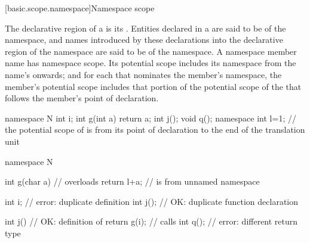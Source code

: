 [basic.scope.namespace]{Namespace scope}

\pnum
{}%
The declarative region of a  is its
.  Entities declared in a
 are said to be  of the
namespace, and names introduced by these declarations into the
declarative region of the namespace are said to be  of the namespace. A namespace member name has namespace scope.
Its potential scope includes its namespace from the name's  onwards; and for each
 that nominates the
member's namespace, the member's potential scope includes that portion
of the potential scope of the  that follows
the member's point of declaration.
\begin{example}
\begin{codeblock}
namespace N {
  int i;
  int g(int a) { return a; }
  int j();
  void q();
}
namespace { int l=1; }
// the potential scope of  is from its point of declaration to the end of the translation unit

namespace N {
  int g(char a) {   // overloads 
    return l+a;     //  is from unnamed namespace
  }

  int i;            // error: duplicate definition
  int j();          // OK: duplicate function declaration

  int j() {         // OK: definition of 
    return g(i);    // calls 
  }
  int q();          // error: different return type
}
\end{codeblock}
\end{example}

